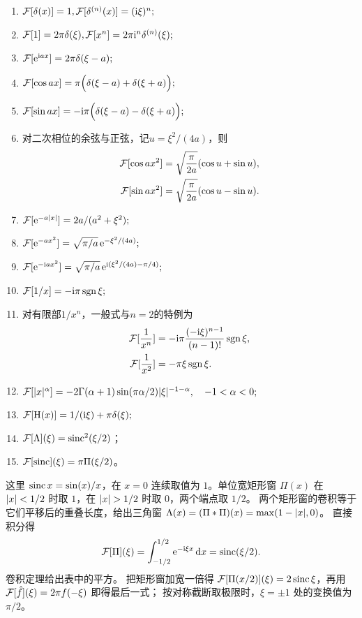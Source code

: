 \begin{enumerate}
	\item $\FT[\delta(x)] = 1,$\qquad$\FT[\delta^{(n)}(x)] = (\i\xi)^n;$
	\item $\FT[1] = 2\pi\delta(\xi),$\qquad$\FT[x^n] = 2\pi\i^n\delta^{(n)}(\xi);$
	\item $\FT[\e^{\i ax}] = 2\pi\delta(\xi - a);$
	\item $\FT[\cos ax] = \pi\Bigp{\delta(\xi - a) + \delta(\xi + a)};$
	\item $\FT[\sin ax] = -\i\pi\Bigp{\delta(\xi - a) - \delta(\xi + a)};$
	\item 对二次相位的余弦与正弦，记$u = \xi^2/(4a)$，则
	\begin{subequations}
		\label{eq:mmp-quadratic-phase-transforms}
		\begin{align}
			\FT[\cos ax^2] &= \sqrt{\frac{\pi}{2a}}(\cos u + \sin u),\\
			\FT[\sin ax^2] &= \sqrt{\frac{\pi}{2a}}(\cos u - \sin u).
		\end{align}
	\end{subequations}
	\item $\FT[\e^{-a\abs x}] = 2a/(a^2 + \xi^2);$
	\item $\FT[\e^{-ax^2}] = \sqrt{\pi/a}\e^{-\xi^2/(4a)};$
	\item $\FT[\e^{-\i ax^2}] = \sqrt{\pi/a}\e^{\i(\xi^2/(4a)-\pi/4)};$
	\item $\FT[1/x] = -\i\pi\sgn\xi;$
	\item 对有限部$1/x^n$，一般式与$n = 2$的特例为
	\begin{subequations}
		\label{eq:mmp-finite-part-fourier}
		\begin{align}
			\FT[\frac1{x^n}] &= -\i\pi\frac{(-\i\xi)^{n-1}}{(n - 1)!}\sgn\xi,\\
			\FT[\frac1{x^2}] &= -\pi\xi\sgn\xi.
		\end{align}
	\end{subequations}
	\item $\FT[\abs x^\alpha] = -2\Gamma(\alpha + 1)\sin(\pi\alpha/2)\abs\xi^{-1-\alpha},\quad -1 < \alpha < 0;$
	\item $\FT[\Heaviside(x)] = 1/(\i\xi) + \pi\delta(\xi);$
	\item $\FT[\Lambda](\xi) = \sinc^2(\xi/2)$；
	\item $\FT[\sinc](\xi) = \pi\Pi(\xi/2)$。
\end{enumerate}
这里 $\sinc x = \sin(x)/x$，在 $x = 0$ 连续取值为 $1$。单位宽矩形窗 $\Pi(x)$ 在
$\abs x < 1/2$ 时取 $1$，在 $\abs x > 1/2$ 时取 $0$，两个端点取 $1/2$。
两个矩形窗的卷积等于它们平移后的重叠长度，给出三角窗 $\Lambda(x) = (\Pi \ast \Pi)(x) = \max(1 - \abs x,0)$。
直接积分得
\[
	\FT[\Pi](\xi) = \int_{-1/2}^{1/2}\e^{-\i\xi x}\d x = \sinc(\xi/2).
\]
卷积定理给出表中的平方。
把矩形窗加宽一倍得 $\FT[\Pi(x/2)](\xi) = 2\sinc\xi$，再用 $\FT[\hat f](\xi) = 2\pi f(-\xi)$ 即得最后一式；
按对称截断取极限时，$\xi = \pm1$ 处的变换值为 $\pi/2$。

